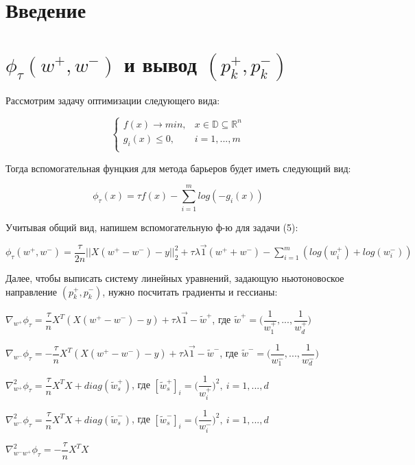 \documentclass[12pt, a4paper]{article}
\begin{document}
    \section{Введение}

    \section{$\phi_\tau(w^+, w^-)$ и вывод $(p_k^+, p_k^-)$}

    Рассмотрим задачу оптимизации следующего вида:

    $$
    \begin{cases}
        f(x) \to min, & x \in \mathbb{D} \subseteq \mathbb{R}^n\\
        g_i(x) \leq 0, & i = 1, ..., m\\
    \end{cases}
    $$

    Тогда вспомогательная фунцкия для метода барьеров будет иметь следующий вид:

    $$\phi_\tau(x) = \tau f(x) - \displaystyle\sum_{i=1}^{m}log(-g_i(x))$$

    Учитывая общий вид, напишем вспомогательную ф-ю для задачи (5):

    $\phi_\tau(w^+, w^-) = \dfrac{\tau}{2n}||X(w^+ - w^-) - y||_2^2 + \tau\lambda\vec{1}(w^+ + w^-) - \displaystyle\sum_{i=1}^{m}(log(w_i^+) + log(w_i^-))$

    \medskip

    Далее, чтобы выписать систему линейных уравнений, задающую ньютоновоское направление $(p_k^+, p_k^-)$, нужно посчитать градиенты и гессианы:

    $\nabla_{w^+} \phi_\tau = \dfrac{\tau}{n} X^T(X(w^+ - w^-) - y) + \tau\lambda\vec{1} - \widetilde{w}^+$, где $\widetilde{w}^+ = \Big(\dfrac{1}{w_1^+}, ..., \dfrac{1}{w_d^+}\Big)$

    $\nabla_{w^-} \phi_\tau = -\dfrac{\tau}{n} X^T(X(w^+ - w^-) - y) + \tau\lambda\vec{1} - \widetilde{w}^-$, где $\widetilde{w}^- = \Big(\dfrac{1}{w_1^-}, ..., \dfrac{1}{w_d^-}\Big)$

    $\nabla_{w^+}^2 \phi_\tau = \dfrac{\tau}{n} X^TX + diag(\widetilde{w}_s^+)$, где $[\widetilde{w}_s^+]_i = \Big(\dfrac{1}{w_i^+}\Big)^2, \ i = 1, ..., d$

    $\nabla_{w^-}^2 \phi_\tau = \dfrac{\tau}{n} X^TX + diag(\widetilde{w}_s^-)$, где $[\widetilde{w}_s^-]_i = \Big(\dfrac{1}{w_i^-}\Big)^2, \ i = 1, ..., d$

    $\nabla_{w^-w^+}^2 \phi_\tau = -\dfrac{\tau}{n} X^TX$
\end{document}
